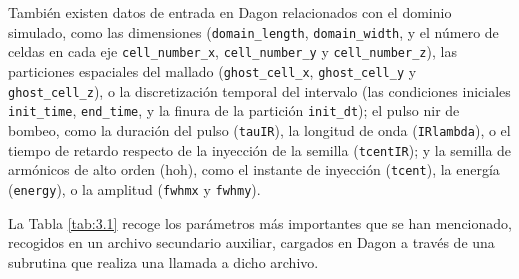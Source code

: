 También existen datos de entrada en Dagon relacionados con el dominio simulado, como las dimensiones (\texttt{domain\_length}, \texttt{domain\_width}, y el número de celdas en cada eje \texttt{cell\_number\_x}, \texttt{cell\_number\_y} y \texttt{cell\_number\_z}), las particiones espaciales del mallado (\texttt{ghost\_cell\_x}, \texttt{ghost\_cell\_y} y \texttt{ghost\_cell\_z}), o la discretización temporal del intervalo (las condiciones iniciales \texttt{init\_time}, \texttt{end\_time}, y la finura de la partición \texttt{init\_dt}); el pulso \acrshort{nir} de bombeo, como la duración del pulso (\texttt{tauIR}), la longitud de onda (\texttt{IRlambda}), o el tiempo de retardo respecto de la inyección de la semilla (\texttt{tcentIR}); y la semilla de armónicos de alto orden (\acrshort{hoh}), como el instante de inyección (\texttt{tcent}), la energía (\texttt{energy}), o la amplitud (\texttt{fwhmx} y \texttt{fwhmy}).

La Tabla \ref{tab:3.1} recoge los parámetros más importantes que se han mencionado, recogidos en un archivo secundario auxiliar, cargados en Dagon a través de una subrutina que realiza una llamada a dicho archivo.

